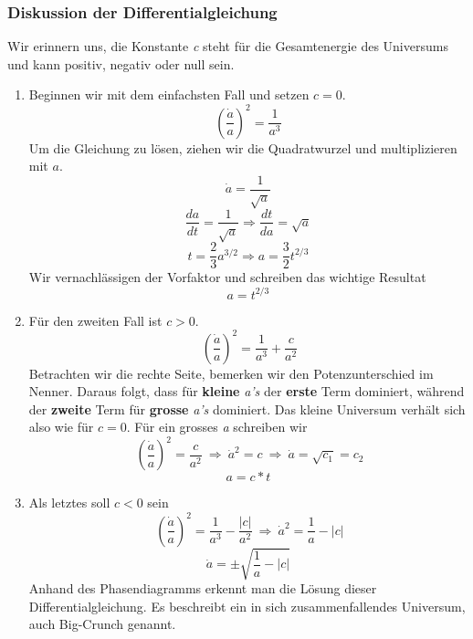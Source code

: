 \begin{refsection}
\subsubsection{Diskussion der Differentialgleichung}
Wir erinnern uns, die Konstante \textit{c} steht für die Gesamtenergie des Universums und kann positiv, negativ oder null sein.
\begin{enumerate}
	\item Beginnen wir mit dem einfachsten Fall und setzen $c = 0$.
	\[\left(\frac{\dot{a}}{a} \right)^2 = \frac{1}{a^3}\]
	Um die Gleichung zu lösen, ziehen wir die Quadratwurzel und multiplizieren mit $a$.
	\[ \dot{a} = \frac{1}{\sqrt{a}} \]
	\[\frac{da}{dt} =\frac{1}{\sqrt{a}} \Rightarrow \frac{dt}{da} = \sqrt{a} \]
	\[ t = \frac{2}{3} a^{3/2} \Rightarrow a = \frac{3}{2} t^{2/3} \]
	Wir vernachlässigen der Vorfaktor und schreiben das wichtige Resultat
	\begin{equation}
	a = t^{2/3}
	\end{equation}
	
	\item Für den zweiten Fall ist $c > 0$.
	\[\ \left(\frac{\dot{a}}{a} \right)^2 = \frac{1}{a^3} + \frac{c}{a^2}\]
	Betrachten wir die rechte Seite, bemerken wir den Potenzunterschied im Nenner. Daraus folgt, dass für \textbf{kleine} \textit{a's} der \textbf{erste} Term dominiert, während der \textbf{zweite} Term für \textbf{grosse} \textit{a's} dominiert. Das kleine Universum verhält sich also wie für $c = 0$. Für ein grosses \textit{a} schreiben wir
	\[\ \left(\frac{\dot{a}}{a} \right)^2 = \frac{c}{a^2} \: \Rightarrow \:	\dot{a}^2 = c \: \Rightarrow \: \dot{a} = \sqrt{c_1} = c_2\]
	\begin{equation}
	a = c*t
	\end{equation}
	
	\item Als letztes soll $c < 0$ sein
	\[\ \left(\frac{\dot{a}}{a} \right)^2 = \frac{1}{a^3} - \frac{|c|}{a^2} \: \Rightarrow \: \dot{a}^2 = \frac{1}{a} - |c|\]
	\begin{equation}
	\dot{a} = \pm \sqrt{\frac{1}{a} - |c|}
	\end{equation}
	Anhand des Phasendiagramms erkennt man die Lösung dieser Differentialgleichung. Es beschreibt ein in sich zusammenfallendes Universum, auch Big-Crunch genannt.
	
\end{enumerate}


\end{refsection}
